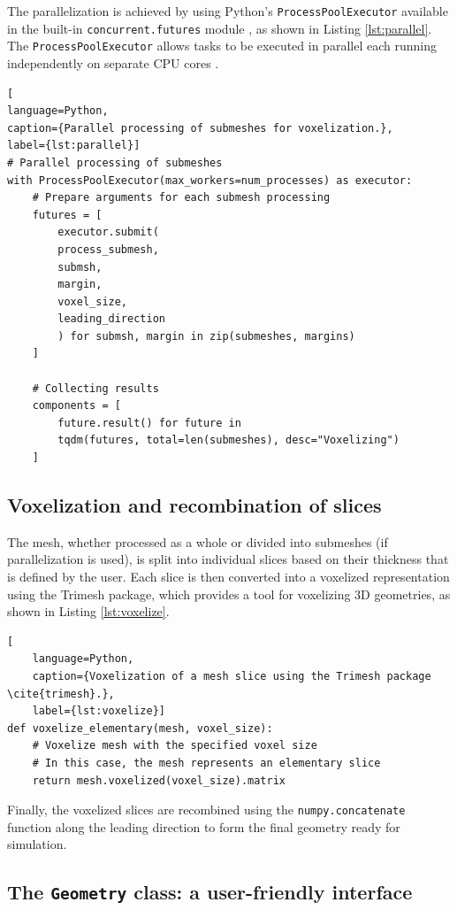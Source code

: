 The parallelization is achieved by using Python’s \texttt{ProcessPoolExecutor} available in the built-in \texttt{concurrent.futures} module \cite{concurrent-futures}, as shown in Listing \ref{lst:parallel}. The \texttt{ProcessPoolExecutor} allows tasks to be executed in parallel each running independently on separate CPU cores \cite{concurrent-futures}.

\begin{lstlisting}[
language=Python,
caption={Parallel processing of submeshes for voxelization.},
label={lst:parallel}]
# Parallel processing of submeshes
with ProcessPoolExecutor(max_workers=num_processes) as executor:
	# Prepare arguments for each submesh processing
	futures = [
		executor.submit(
		process_submesh,
		submsh,
		margin,
		voxel_size,
		leading_direction
		) for submsh, margin in zip(submeshes, margins)
	]
	
	# Collecting results
	components = [
		future.result() for future in 
		tqdm(futures, total=len(submeshes), desc="Voxelizing")
	]
\end{lstlisting}

\subsection{Voxelization and recombination of slices}\label{voxelizing and recombining}

The mesh, whether processed as a whole or divided into submeshes (if parallelization is used), is split into individual slices based on their thickness that is defined by the user. Each slice is then converted into a voxelized representation using the Trimesh package, which provides a tool for voxelizing 3D geometries, as shown in Listing \ref{lst:voxelize}.

\begin{lstlisting}[
	language=Python,
	caption={Voxelization of a mesh slice using the Trimesh package \cite{trimesh}.},
	label={lst:voxelize}]
def voxelize_elementary(mesh, voxel_size):
	# Voxelize mesh with the specified voxel size
	# In this case, the mesh represents an elementary slice
	return mesh.voxelized(voxel_size).matrix
\end{lstlisting}

Finally, the voxelized slices are recombined using the \texttt{numpy.concatenate} function \cite{numpy} along the leading direction to form the final geometry ready for simulation.


\subsection{The \texttt{Geometry} class: a user-friendly interface}

